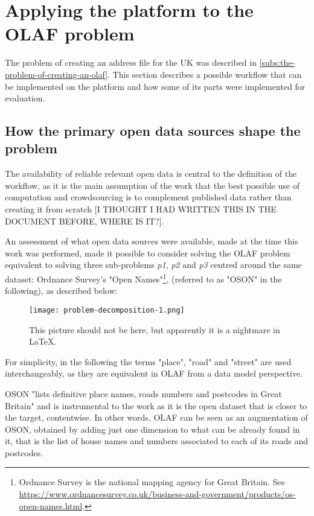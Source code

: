 \section{Applying the platform to the OLAF problem}

The problem of creating an address file for the UK was described in \ref{subs:the-problem-of-creating-an-olaf}. This section describes a possible workflow that can be implemented on the platform and how some of its parts were implemented for evaluation.

\subsection{How the primary open data sources shape the problem}

The availability of reliable relevant open data is central to the definition of the workflow, as it is the main assumption of the work that the best possible use of computation and crowdsourcing is to complement published data rather than creating it from scratch [I THOUGHT I HAD WRITTEN THIS IN THE DOCUMENT BEFORE, WHERE IS IT?]. 

An assessment of what open data sources were available, made at the time this work was performed, made it possible to consider solving the OLAF problem equivalent to solving three sub-problems {\it p1}, {\it p2} and {\it p3} centred around the same dataset: Ordnance Survey's "Open Names"\footnote{Ordnance Survey is the national mapping agency for Great Britain. See \url{https://www.ordnancesurvey.co.uk/business-and-government/products/os-open-names.html}.}, (referred to as "OSON" in the following), as described below:

\begin{figure}
	\texttt{[image: problem-decomposition-1.png]}
	\caption{This picture should not be here, but apparently it is a nightmare in LaTeX.}
	\label{fig:problem_decomposition_1}
\end{figure}

For simplicity, in the following the terms "place", "road" and "street" are used interchangeably, as they are equivalent in OLAF from a data model perspective.

OSON "lists definitive place names, roads numbers and postcodes in Great Britain" and is instrumental to the work as it is the open dataset that is closer to the target, contentwise. In other words, OLAF can be seen as an augmentation of OSON, obtained by adding just one dimension to what can be already found in it, that is the list of house names and numbers associated to each of its roads and postcodes. 
    
